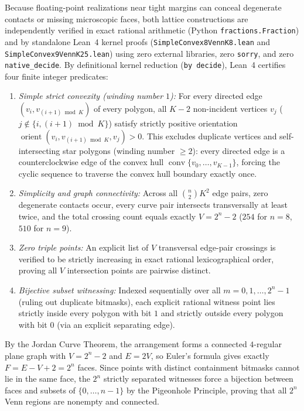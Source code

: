 \documentclass[11pt]{article}
\begin{document}
Because floating-point realizations near tight margins can conceal degenerate contacts or missing microscopic faces, both lattice constructions are independently verified in exact rational arithmetic (Python \texttt{fractions.Fraction}) and by standalone Lean~4 kernel proofs (\texttt{SimpleConvex8VennK8.lean} and \texttt{SimpleConvex9VennK25.lean}) using zero external libraries, zero \texttt{sorry}, and zero \texttt{native\_decide}. By definitional kernel reduction (\texttt{by decide}), Lean~4 certifies four finite integer predicates:
\begin{enumerate}
\item \emph{Simple strict convexity (winding number $1$):} For every directed edge $(v_i, v_{(i+1)\bmod K})$ of every polygon, all $K-2$ non-incident vertices $v_j$ ($j \notin \{i, (i+1)\bmod K\}$) satisfy strictly positive orientation $\operatorname{orient}(v_i, v_{(i+1)\bmod K}, v_j) > 0$. This excludes duplicate vertices and self-intersecting star polygons (winding number $\ge 2$): every directed edge is a counterclockwise edge of the convex hull $\operatorname{conv}\{v_0,\dots,v_{K-1}\}$, forcing the cyclic sequence to traverse the convex hull boundary exactly once.
\item \emph{Simplicity and graph connectivity:} Across all $\binom{n}{2} K^2$ edge pairs, zero degenerate contacts occur, every curve pair intersects transversally at least twice, and the total crossing count equals exactly $V = 2^n - 2$ ($254$ for $n=8$, $510$ for $n=9$).
\item \emph{Zero triple points:} An explicit list of $V$ transversal edge-pair crossings is verified to be strictly increasing in exact rational lexicographical order, proving all $V$ intersection points are pairwise distinct.
\item \emph{Bijective subset witnessing:} Indexed sequentially over all $m = 0, 1, \dots, 2^n - 1$ (ruling out duplicate bitmasks), each explicit rational witness point lies strictly inside every polygon with bit $1$ and strictly outside every polygon with bit $0$ (via an explicit separating edge).
\end{enumerate}

By the Jordan Curve Theorem, the arrangement forms a connected $4$-regular plane graph with $V = 2^n - 2$ and $E = 2V$, so Euler's formula gives exactly $F = E - V + 2 = 2^n$ faces. Since points with distinct containment bitmasks cannot lie in the same face, the $2^n$ strictly separated witnesses force a bijection between faces and subsets of $\{0, \dots, n-1\}$ by the Pigeonhole Principle, proving that all $2^n$ Venn regions are nonempty and connected.
\end{document}
